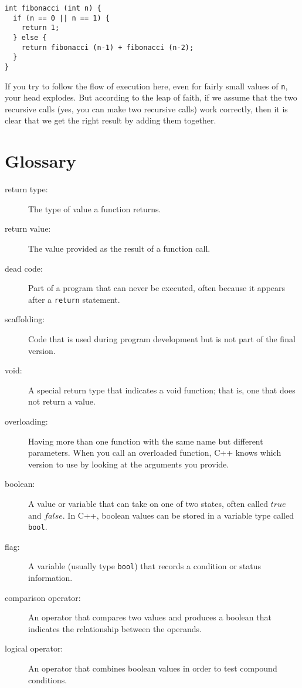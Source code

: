 \begin{verbatim}
int fibonacci (int n) {
  if (n == 0 || n == 1) {
    return 1;
  } else {
    return fibonacci (n-1) + fibonacci (n-2);
  }
}
\end{verbatim}
%
If you try to follow the flow of execution here, even for fairly small
values of {\tt n}, your head explodes.  But according to the leap of
faith, if we assume that the two recursive calls (yes, you can make
two recursive calls) work correctly, then it is clear that we get the
right result by adding them together.

\section{Glossary}

\begin{description}

\item[return type:]  The type of value a function returns.

\item[return value:]  The value provided as the result of a function
call.

\item[dead code:]  Part of a program that can never be executed,
often because it appears after a {\tt return} statement.

\item[scaffolding:]  Code that is used during program development
but is not part of the final version.

\item[void:]  A special return type that indicates a void function;
that is, one that does not return a value.

\item[overloading:]  Having more than one function with the same name
but different parameters.  When you call an overloaded function,
C++ knows which version to use by looking at the arguments you
provide.

\item[boolean:]  A value or variable that can take on one of
two states, often called $true$ and $false$.  In C++, boolean
values can be stored in a variable type called {\tt bool}.

\item[flag:]  A variable (usually type {\tt bool}) that records
a condition or status information.

\item[comparison operator:]  An operator that compares two values
and produces a boolean that indicates the relationship between the
operands.

\item[logical operator:]  An operator that combines boolean values
in order to test compound conditions.


\end{description}

